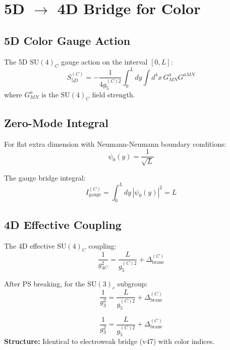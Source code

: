 \documentclass[11pt,a4paper]{article}
\theoremstyle{definition}
\begin{document}
\section{5D $\to$ 4D Bridge for Color}
\label{sec:5d-bridge}

\subsection{5D Color Gauge Action}
\label{subsec:5d-color-action}

The 5D $\text{SU}(4)_C$ gauge action on the interval $[0, L]$:
\begin{equation}
  \label{eq:5d-su4-action}
  S_{5D}^{(C)} = -\frac{1}{4g_5^{(C)2}} \int_0^L dy \int d^4x \, G_{MN}^a G^{aMN}
\end{equation}
where $G_{MN}^a$ is the $\text{SU}(4)_C$ field strength.

\subsection{Zero-Mode Integral}
\label{subsec:zero-mode}

For flat extra dimension with Neumann-Neumann boundary conditions:
\begin{equation}
  \label{eq:zero-mode-profile}
  \psi_0(y) = \frac{1}{\sqrt{L}}
\end{equation}

The gauge bridge integral:
\begin{equation}
  \label{eq:gauge-integral}
  I_{\text{gauge}}^{(C)} = \int_0^L dy \, |\psi_0(y)|^2 = L
\end{equation}

\subsection{4D Effective Coupling}
\label{subsec:4d-coupling}

The 4D effective $\text{SU}(4)_C$ coupling:
\begin{equation}
  \label{eq:4d-effective-su4}
  \frac{1}{g_{4C}^2} = \frac{L}{g_5^{(C)2}} + \Delta_{\text{brane}}^{(C)}
\end{equation}

After PS breaking, for the $\text{SU}(3)_c$ subgroup:
\begin{equation}
  \label{eq:4d-effective-su3}
  \frac{1}{g_3^2} = \frac{L}{g_5^{(C)2}} + \Delta_{\text{brane}}^{(C)}
\end{equation}

\begin{canonbox}
\begin{equation}
  \label{eq:color-bridge}
  \boxed{\frac{1}{g_3^2} = \frac{L}{g_5^{(C)2}} + \Delta_{\text{brane}}^{(C)}}
\end{equation}
\textbf{Structure:} Identical to electroweak bridge (v47) with color indices.
\end{canonbox}
\end{document}
